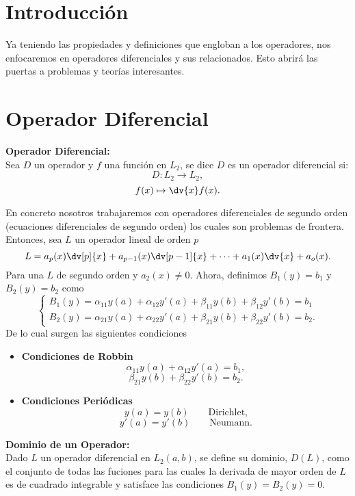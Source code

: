 \section*{Introducción}
Ya teniendo las propiedades y definiciones que engloban a los operadores, nos enfocaremos en operadores diferenciales y sus relacionados. Esto abrirá las puertas a problemas y teorías interesantes.


\section*{Operador Diferencial}




\begin{mdframed}[style=warning]
	{\Large \textbf{Operador Diferencial:}} \\
	Sea $D$ un operador y $f$ una función en $L_2$, se dice $D$ es un operador diferencial si:
	$$ D:L_2 \to L_2, $$
	$$ f(x) \mapsto \dv{x} f(x). $$
\end{mdframed}

En concreto nosotros trabajaremos con operadores diferenciales de segundo orden (ecuaciones diferenciales de segundo orden) los cuales son problemas de frontera. Entonces, sea $L$ un operador lineal de orden $p$
	$$ L = a_p (x) \dv[p]{x} + a_{p - 1} (x) \dv[p - 1]{x} + \cdots + a_1 (x) \dv{x} + a_o (x). $$
Para una $L$ de segundo orden y $a_2 (x) \neq 0$. Ahora, definimos $B_1 (y) = b_1$ y $B_2 (y) = b_2$ como
	$$ 
		\left\{\begin{array}{c}
			B_1 (y) = \alpha _{11} y(a) + \alpha _{12} y'(a) + \beta _{11} y(b) + \beta _{12} y'(b) = b_1 \\
			B_2 (y) = \alpha _{21} y(a) + \alpha _{22} y'(a) + \beta _{21} y(b) + \beta _{22} y'(b) = b_2.
		\end{array}\right.			
	$$
De lo cual surgen las siguientes condiciones
\begin{itemize}
	\item \textbf{Condiciones de Robbin}
		$$ \alpha _{11} y(a) + \alpha _{12} y'(a) = b_1, $$
		$$ \beta _{21} y(b) + \beta _{22} y'(b) = b_2 . $$
	\item \textbf{Condiciones Periódicas}
		$$ y(a) = y(b) \qquad \text{Dirichlet,} $$
		$$ y'(a) = y'(b) \qquad \text{Neumann.} $$
\end{itemize}





\begin{mdframed}[style=warning]
	{\Large \textbf{Dominio de un Operador:}} \\
	Dado $L$ un operador diferencial en $L_2 (a,b)$, se define su dominio, $D(L)$, como el conjunto de todas las fuciones para las cuales la derivada de mayor orden de $L$ es de cuadrado integrable y satisface las condiciones $B_1 (y) = B_2 (y) = 0$.
\end{mdframed}




